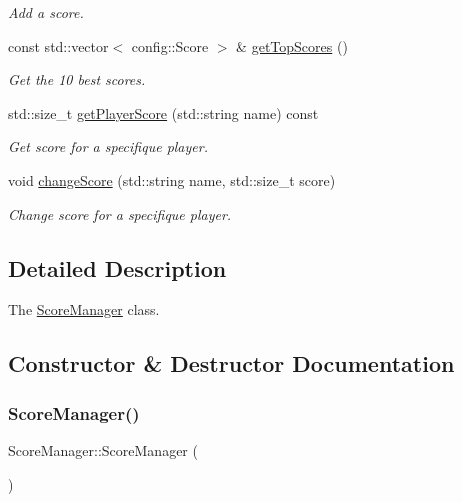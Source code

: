 \begin{DoxyCompactItemize}
\begin{DoxyCompactList}\small\item\em Add a score. \end{DoxyCompactList}\item 
\mbox{\label{classScoreManager_ad0c38dd0a27a82230d09f29ce3d12349}} 
const std\+::vector$<$ config\+::\+Score $>$ \& \hyperlink{classScoreManager_ad0c38dd0a27a82230d09f29ce3d12349}{get\+Top\+Scores} ()
\begin{DoxyCompactList}\small\item\em Get the 10 best scores. \end{DoxyCompactList}\item 
std\+::size\+\_\+t \hyperlink{classScoreManager_abc6c1d76fdcc17f1b8ebe4c7bf5550e2}{get\+Player\+Score} (std\+::string name) const
\begin{DoxyCompactList}\small\item\em Get score for a specifique player. \end{DoxyCompactList}\item 
void \hyperlink{classScoreManager_a01a80dda216fa5b83b58bca8de49114e}{change\+Score} (std\+::string name, std\+::size\+\_\+t score)
\begin{DoxyCompactList}\small\item\em Change score for a specifique player. \end{DoxyCompactList}\end{DoxyCompactItemize}


\subsection{Detailed Description}
The \hyperlink{classScoreManager}{Score\+Manager} class. 

\subsection{Constructor \& Destructor Documentation}
\mbox{\label{classScoreManager_a4f3866ff832127664543349da5c4fbf4}} 
\subsubsection{\texorpdfstring{Score\+Manager()}{ScoreManager()}}
{\footnotesize\ttfamily Score\+Manager\+::\+Score\+Manager (\begin{DoxyParamCaption}{ }\end{DoxyParamCaption})}



